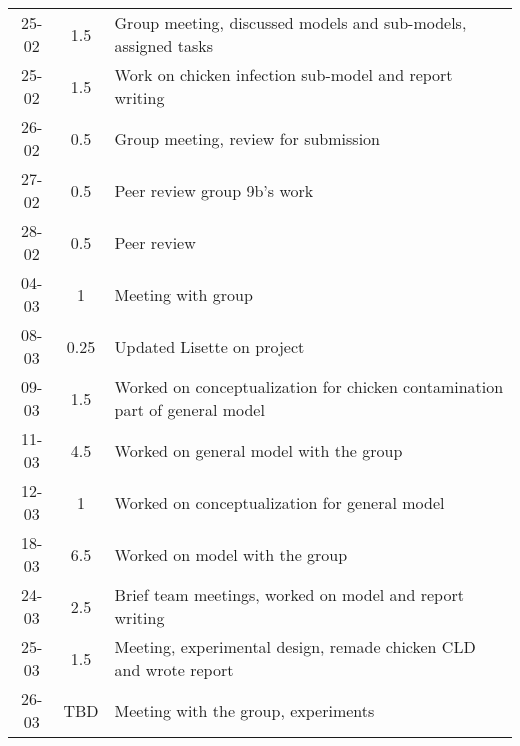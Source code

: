 \begin{longtable}[c]{c|c|m{35em}}
25-02   &   1.5     &   Group meeting, discussed models and sub-models, assigned tasks              \\
25-02   &   1.5     &   Work on chicken infection sub-model and report writing                      \\
26-02   &   0.5     &   Group meeting, review for submission                                        \\
27-02   &   0.5     &   Peer review group 9b's work                                                 \\
28-02   &   0.5     &   Peer review                                                                 \\
04-03   &   1       &   Meeting with group                                                          \\
08-03   &   0.25    &   Updated Lisette on project                                                 \\
09-03   &   1.5     &   Worked on conceptualization for chicken contamination part of general model \\
11-03   &   4.5     &   Worked on general model with the group                                      \\
12-03   &   1       &   Worked on conceptualization for general model                               \\
18-03   &   6.5     &   Worked on model with the group                                              \\
24-03   &   2.5     &   Brief team meetings, worked on model and report writing                     \\
25-03   &   1.5     &   Meeting, experimental design, remade chicken CLD and wrote report           \\
26-03   &   TBD     &   Meeting with the group, experiments                                         \\



\end{longtable}

